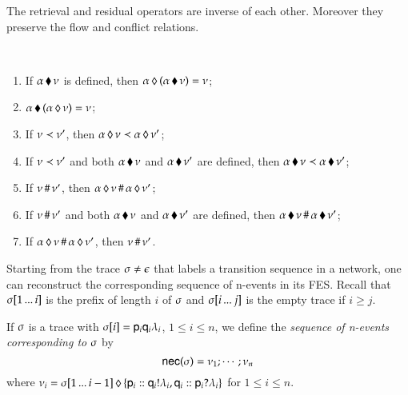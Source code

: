 \bigskip

 The retrieval and residual operators are inverse of each other. Moreover they preserve the flow and conflict relations. %

\begin{lemma}\text{~}\\[-10pt]
\begin{enumerate}
\item {} If $\post{\netev}{\alpha}$ is defined, then
  $\preP{\post{\netev}{\alpha}}{\alpha}=\netev$;
\item {} 
$\postP{\pre{\netev}{\alpha}}{\alpha}=\netev$;
 \item  {}  If  $\netev\precN \netev'$, 
then $\pre{\netev}{\alpha}\precN \pre{\netev'}{\alpha}$;
\item {} If  $\netev\precN \netev'$ and both $\post{\netev}{\alpha}$ and
  $\post{\netev'}{\alpha}$ are defined, then
  $\post{\netev}{\alpha}\precN \post{\netev'}{\alpha}$; 
\item {} If  $\netev\grr \netev'$, then $\pre{\netev}{\alpha}\grr
  \pre{\netev'}{\alpha}$;
\item {} If  $\netev\grr
  \netev'$ and both $\post{\netev}{\alpha}$ and $\post{\netev'}{\alpha}$
  are defined, then $\post{\netev}{\alpha}\grr\post{\netev'}{\alpha}$;
  \item {} If  $\pre{\netev}{\alpha}\grr
  \pre{\netev'}{\alpha}$, then $\netev\grr \netev'$.
\end{enumerate}
\end{lemma}


Starting from the trace $\comseq \neq \ee$  that labels a transition
sequence  in a network, one can
reconstruct the corresponding sequence of n-events in its 
FES.  Recall
that  $\range\comseq1{i}$ is the prefix of length $i$ of 
$\comseq$ and $\range{\comseq}{i}{j}$ is the empty trace if $i\geq
j$.


\begin{definition}
   If $\comseq$ is a trace with
  $\at\comseq{i}=\Comm{\pp_i}{\la_i}{\q_i}$, $1\leq i\leq n$, we
  define
  the {\em sequence of n-events corresponding to $\comseq$} by
  \[
  \nec{\comseq}=\Seq{\netev_1;\cdots}{\netev_n}
  \]
 where
  $\netev_i=\pre{\set{\locev{\pp_i}{\sendL{\q_i}{\la_i}},\locev{\q_i}{\rcvL{\pp_i}
        {\la_i}}}}{\range\comseq1{i-1}}$ for $1\leq i\leq n$.
  \end{definition}
   
